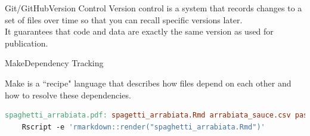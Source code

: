 \documentclass[12pt,t]{beamer}
\begin{document}
{{
  \begin{frame}[plain]
  \end{frame}
}
{
  \begin{frame}[plain]
  \end{frame}
}
\begin{frame}[c]{Git/GitHub\textemdash{}Version Control}
  Version control is a system that records changes to a set of files
  over time so that you can recall specific versions later.\\
  \vspace{10mm}
  It guarantees that code and data are exactly the same version as used for
  publication.
\end{frame}

\begin{frame}[c, fragile]{Make\textemdash{}Dependency Tracking}

Make is a ``recipe" language that describes how files depend on each other and how to resolve these dependencies.
\vspace{10mm}
\begin{lstlisting}[language=make,basicstyle=\ttfamily\scriptsize]
spaghetti_arrabiata.pdf: spagetti_arrabiata.Rmd arrabiata_sauce.csv pasta.csv
    Rscript -e 'rmarkdown::render("spaghetti_arrabiata.Rmd")'


\end{lstlisting}
\end{frame}}
\end{document}

